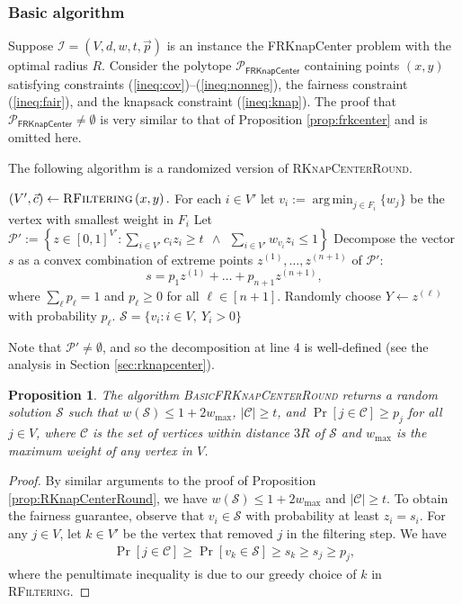 \documentclass[a4paper,11pt]{article}
\newtheorem{proposition}[theorem]{Proposition}
\DeclareMathOperator*{\argmin}{arg\,min}
\newcommand{\C}{\mathcal{C}}
\renewcommand{\S}{\mathcal{S}}
\newcommand{\I}{\mathcal{I}}
\renewcommand{\P}{\mathcal{P}}
\begin{document}
\subsubsection{Basic algorithm}

Suppose $\I = (V, d, w,  t, \vec{p})$ is an instance the \textsf{FRKnapCenter} problem with the optimal radius $R$. Consider the polytope $\P_\textsf{FRKnapCenter}$  containing points $(x, y)$ satisfying constraints (\ref{ineq:cov})--(\ref{ineq:nonneg}), the fairness constraint (\ref{ineq:fair}), and the knapsack constraint (\ref{ineq:knap}). The proof that $\P_\textsf{FRKnapCenter} \neq \emptyset$ is very similar to that of Proposition \ref{prop:frkcenter} and is omitted here.

The following algorithm is a randomized version of 
\textsc{RKnapCenterRound}.

\begin{algorithm}[h]
\caption{$\textsc{BasicFRKnapCenterRound}\left(x,y \right)$}
\begin{algorithmic}[1]
\STATE $(V',\vec{c}) \gets \textsc{RFiltering}\left(x,y \right).$
\STATE For each $i \in V'$ let $v_i := \argmin_{j \in F_i}\{w_j\}$ be the vertex with smallest weight in $F_i$
\STATE Let $\P' := \left\{z \in [0,1]^{V'}: \sum_{i\in V'}c_i z_i \geq t ~~\wedge ~~ \sum_{i \in V'} w_{v_i} z_i \leq 1 \right\}$
\STATE Decompose the vector $s$ as a convex combination of extreme points $z^{(1)}, \ldots, z^{(n+1)}$ of $\P'$:
$$ s = p_1 z^{(1)} + \ldots + p_{n+1} z^{(n+1)},$$
where $\sum_\ell p_\ell = 1$ and $p_\ell \geq 0$ for all $\ell \in [n+1]$. 
\STATE Randomly choose $Y \gets z^{(\ell)}$ with probability $p_\ell$.
\RETURN $\S = \{v_i: i \in V,~ Y_i > 0\}$
\end{algorithmic} 
\label{algo:basicrfknapcenter}
\end{algorithm}

Note that $\P' \neq \emptyset$, and so the decomposition at line 4 is well-defined (see the analysis in Section \ref{sec:rknapcenter}).

\begin{proposition}
The algorithm \textsc{BasicFRKnapCenterRound} returns a random solution $\S$ such that $w(\S) \leq 1 + 2w_{\text{max}}$, $|\C| \geq t$, and $\Pr[j \in \C] \geq p_j$ for all $j \in V$, where $\C$ is the set of vertices within distance $3R$ of $\S$ and $w_{\text{max}}$ is the maximum weight of any vertex in $V$.
\label{prop:basicrfknapcenter}
\end{proposition}
\begin{proof}
By similar arguments to the proof of Proposition \ref{prop:RKnapCenterRound}, we have $w(\S) \leq 1 + 2w_{\text{max}}$ and $|\C| \geq t$. To obtain the fairness guarantee, observe that $v_i \in \S$ with probability at least $z_i = s_i$. For any $j \in V$, let $k \in V'$ be the vertex that removed $j$ in the filtering step. We have
\begin{align*}
	\Pr[j \in \C] \geq \Pr[v_k \in \S] \geq s_k \geq s_j \geq p_j,
\end{align*}
where the penultimate inequality is due to our greedy choice of $k$ in \textsc{RFiltering}.
\end{proof}
\end{document}
